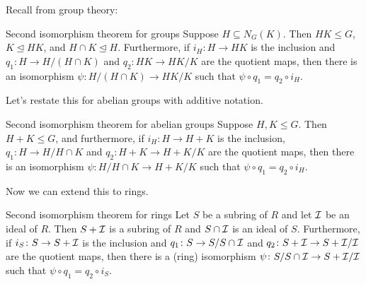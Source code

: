 \documentclass[12pt,letterpaper]{report}
\begin{document}
Recall from group theory:

\begin{thm}{Second isomorphism theorem for groups}{}
  Suppose $H \subseteq N_G(K)$.
  Then $HK \leq G$, $K \trianglelefteq HK$, and $H \cap K \trianglelefteq H$.
  Furthermore, if $i_H \colon H \to HK$ is the inclusion and $q_1 \colon H \to H/(H \cap K)$ and
  $q_2 \colon HK \to HK/K$ are the quotient maps, then there is an isomorphism
  $\psi \colon H/(H \cap K) \to HK/K$ such that $\psi \circ q_1 = q_2 \circ i_H$.
\end{thm}

\begin{center}
\end{center}

Let's restate this for abelian groups with additive notation.

\begin{thm}{Second isomorphism theorem for abelian groups}{}
  Suppose $H, K \leq G$.
  Then $H + K \leq G$, and furthermore, if $i_H \colon H \to H + K$ is the inclusion,
  $q_1 \colon H \to H/H \cap K$ and $q_2 \colon H + K \to H + K/K$ are the quotient maps, then
  there is an isomorphism $\psi \colon H/H \cap K \to H + K/K$ such that
  $\psi \circ q_1 = q_2 \circ i_H$.
\end{thm}

\begin{center}
\end{center}

Now we can extend this to rings.

\begin{thm}{Second isomorphism theorem for rings}{}
  Let $S$ be a subring of $R$ and let $\mathcal{I}$ be an ideal of $R$.
  Then $S + \mathcal{I}$ is a subring of $R$ and $S \cap \mathcal{I}$ is an ideal of $S$.
  Furthermore, if $i_S \colon S \to S + \mathcal{I}$ is the inclusion and
  $q_1 \colon S \to S/S \cap \mathcal{I}$ and $q_2 \colon S + \mathcal{I} \to S + \mathcal{I}/\mathcal{I}$ are the
  quotient maps, then there is a (ring) isomorphism
  $\psi \colon S/S \cap \mathcal{I} \to S + \mathcal{I}/\mathcal{I}$ such that $\psi \circ q_1 = q_2 \circ i_S$.
\end{thm}
\end{document}
